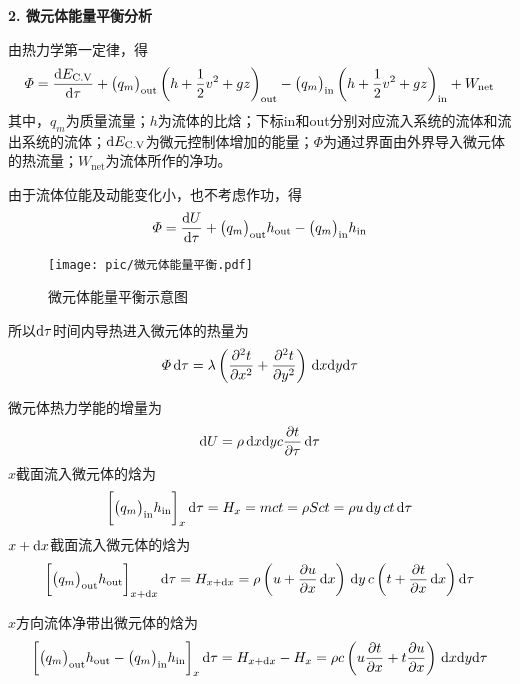 \noindent \textbf{2. 微元体能量平衡分析}

由热力学第一定律，得
\begin{equation}
	\varPhi = \dfrac{{\rm{d}} E_{\text{C.V}}}{{\rm{d}} \tau} + \big(q_m\big)_{\text{out}} \left(h + \dfrac{1}{2}v^2 + gz\right)_{\text{out}} - \big(q_m\big)_{\text{in}} \left(h + \dfrac{1}{2} v^2 + gz\right)_{\text{in}} + W_{\text{net}}
\end{equation}
其中，$q_m$为质量流量；$h$为流体的比焓；下标in和out分别对应流入系统的流体和流出系统的流体；${\rm{d}} E_{\text{C.V}}$为微元控制体增加的能量；$\varPhi$为通过界面由外界导入微元体的热流量；$W_{\text{net}}$为流体所作的净功。

由于流体位能及动能变化小，也不考虑作功，得
\begin{equation}
	\varPhi = \dfrac{{\rm{d}} U}{{\rm{d}} \tau} + \big(q_m\big)_{\text{out}}h_{\text{out}}-\big(q_m\big)_{\text{in}}h_{\text{in}}
\end{equation}
\begin{figure}[!htb]
	\centering
	\vspace*{-2em}
	\texttt{[image: pic/微元体能量平衡.pdf]}
	\vspace*{-1em}
	\caption{微元体能量平衡示意图}
	\label{微元体能量平衡}
\end{figure}

所以${\rm{d}} \tau$时间内导热进入微元体的热量为
\begin{equation}
	\varPhi \, {\rm{d}} \tau = \lambda \left(\dfrac{\partial^2 t}{\partial x^2} + \dfrac{\partial^2 t}{\partial y^2}\right) \, {\rm{d}} x {\rm{d}} y {\rm{d}} \tau
\end{equation}

微元体热力学能的增量为
\begin{equation}
	{\rm{d}} U = \rho \, {\rm{d}} x {\rm{d}} y c \dfrac{\partial t}{\partial \tau}\, {\rm{d}} \tau
	\label{能量守恒分析}
\end{equation}
$x$截面流入微元体的焓为
\begin{equation}
	\bigg[\big(q_m\big)_{\text{in}}h_{\text{in}}\bigg]_x \, {\rm{d}} \tau = H_x = mct = \rho S c t = \rho u \, {\rm{d}} y \, ct \, {\rm{d}} \tau
\end{equation}
$x + {\rm{d}} x$截面流入微元体的焓为
\begin{equation}
	\bigg[\big( q_m \big)_{\text{out}} h_{\text{out}}\bigg]_{x+{\rm{d}} x} \, {\rm{d}} \tau = H_{x +{\rm{d}} x} = \rho \left(u+\dfrac{\partial u}{\partial x}\, {\rm{d}} x\right) \, {\rm{d}} y \, c \left(t + \dfrac{\partial t}{\partial x}\, {\rm{d}} x\right) {\rm{d}} \tau
\end{equation}

$x$方向流体净带出微元体的焓为
\begin{equation}
	\bigg[\big( q_m \big)_{\text{out}} h_{\text{out}} -\big(q_m \big)_{\text{in}} h_{\text{in}} \bigg]_{x} \, {\rm{d}} \tau = H_{x + {\rm{d}} x} - H_x = \rho c \left(u \dfrac{\partial t}{\partial x} + t \dfrac{\partial u}{\partial x}\right)\, {\rm{d}} x {\rm{d}} y {\rm{d}} \tau
\end{equation}

